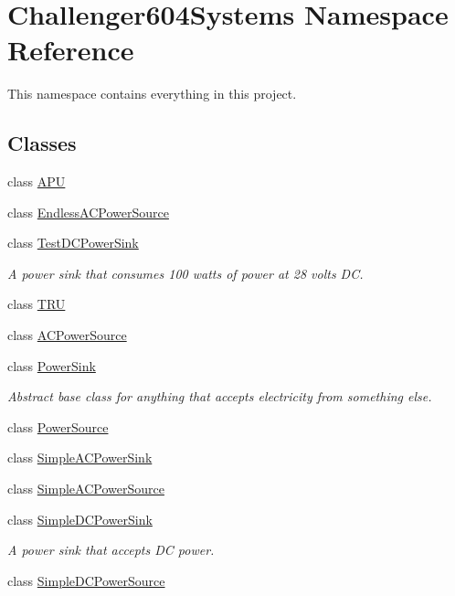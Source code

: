 \hypertarget{namespace_challenger604_systems}{\section{Challenger604\-Systems Namespace Reference}
\label{namespace_challenger604_systems}
}


This namespace contains everything in this project.  


\subsection*{Classes}
\begin{DoxyCompactItemize}
\item 
class \hyperlink{class_challenger604_systems_1_1_a_p_u}{A\-P\-U}
\item 
class \hyperlink{class_challenger604_systems_1_1_endless_a_c_power_source}{Endless\-A\-C\-Power\-Source}
\item 
class \hyperlink{class_challenger604_systems_1_1_test_d_c_power_sink}{Test\-D\-C\-Power\-Sink}
\begin{DoxyCompactList}\small\item\em A power sink that consumes 100 watts of power at 28 volts D\-C. \end{DoxyCompactList}\item 
class \hyperlink{class_challenger604_systems_1_1_t_r_u}{T\-R\-U}
\item 
class \hyperlink{class_challenger604_systems_1_1_a_c_power_source}{A\-C\-Power\-Source}
\item 
class \hyperlink{class_challenger604_systems_1_1_power_sink}{Power\-Sink}
\begin{DoxyCompactList}\small\item\em Abstract base class for anything that accepts electricity from something else. \end{DoxyCompactList}\item 
class \hyperlink{class_challenger604_systems_1_1_power_source}{Power\-Source}
\item 
class \hyperlink{class_challenger604_systems_1_1_simple_a_c_power_sink}{Simple\-A\-C\-Power\-Sink}
\item 
class \hyperlink{class_challenger604_systems_1_1_simple_a_c_power_source}{Simple\-A\-C\-Power\-Source}
\item 
class \hyperlink{class_challenger604_systems_1_1_simple_d_c_power_sink}{Simple\-D\-C\-Power\-Sink}
\begin{DoxyCompactList}\small\item\em A power sink that accepts D\-C power. \end{DoxyCompactList}\item 
class \hyperlink{class_challenger604_systems_1_1_simple_d_c_power_source}{Simple\-D\-C\-Power\-Source}
\end{DoxyCompactItemize}
